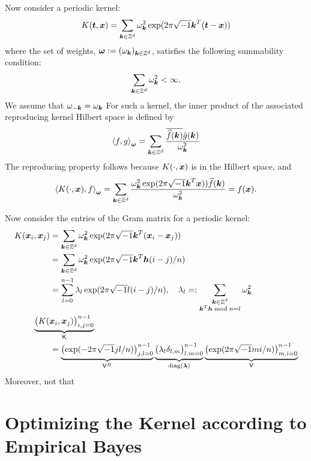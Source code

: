 \documentclass{amsart}
\begin{document}
Now consider a periodic kernel:
\begin{equation*}
    K(\vt,\vx) = \sum_{\vk \in \integers^d} \omega_{\vk}^2 \exp(2 \pi \sqrt{-1} \vk^T (\vt - \vx))
\end{equation*}
where the set of weights, $\vomega : = (\omega_{\vk})_{\vk \in \integers^d}$, satisfies the following summability condition:
\begin{equation*}
    \sum_{\vk \in \integers^d} \omega_{\vk}^2 < \infty.
\end{equation*}
We assume that $\omega_{-\vk} = \omega_{\vk}$ For such a kernel, the inner product of the associated reproducing kernel Hilbert space is defined by 
\begin{equation*}
    \ip[\vomega]{f}{g} = \sum_{\vk \in \integers^d} 
    \frac{\overline{\hf(\vk)} \hg(\vk)}{\omega_{\vk}^2}
\end{equation*}
The reproducing property follows because $K(\cdot,\vx)$ is in the Hilbert space, and 
\begin{equation*}
    \ip[\vomega]{K(\cdot,\vx)}{f} 
    = \sum_{\vk \in \integers^d} 
    \frac{ \omega_{\vk}^2 \exp(2 \pi \sqrt{-1} \vk^T \vx)) \hf(\vk)}{\omega_{\vk}^2} = f(\vx).
\end{equation*}

Now consider the entries of the Gram matrix for a periodic kernel:
\begin{align*}
    K(\vx_i,\vx_j)  &= \sum_{\vk \in \integers^d} \omega_{\vk}^2 \exp(2 \pi \sqrt{-1} \vk^T(\vx_i - \vx_j)) \\
    & = \sum_{\vk \in \integers^d} \omega_{\vk}^2 \exp(2 \pi \sqrt{-1} \vk^T \vh (i-j)/n) \\
    & = \sum_{l = 0}^{n-1} \lambda_l \exp(2 \pi \sqrt{-1} l (i-j)/n), \quad \lambda_l =: \sum_{\substack{\vk \in \integers^d \\ \vk^T\vh \bmod n = l}} \omega_{\vk}^2 \\
    \MoveEqLeft \underbrace{\bigl ( K(\vx_i,\vx_j)\bigr)_{i,j = 0}^{n-1}}_{\mK} \\
    &
    = \underbrace{\bigl ( \exp(-2 \pi \sqrt{-1} jl/n) \bigr)_{j,l = 0}^{n-1}}_{\mV^H} 
    \underbrace{\bigl ( \lambda_l \delta_{l,m} \bigr)_{l,m = 0}^{n-1}}_{\diag(\vlambda)} 
    \underbrace{\bigl ( \exp(2 \pi \sqrt{-1} mi/n) \bigr)_{m,i = 0}^{n-1}}_{\mV}
\end{align*}
Moreover, not that 

\section{Optimizing the Kernel according to Empirical Bayes}





\end{document}
